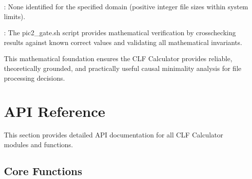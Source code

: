 \documentclass[letterpaper,10pt,english]{sphinxmanual}
\begin{document}
\sphinxAtStartPar
{}: None identified for the specified domain (positive integer file sizes within system limits).

\sphinxAtStartPar
{}: The pic2\_gate.sh script provides mathematical verification by cross\sphinxhyphen{}checking results against known correct values and validating all mathematical invariants.

\sphinxAtStartPar
This mathematical foundation ensures the CLF Calculator provides reliable, theoretically grounded, and practically useful causal minimality analysis for file processing decisions.

\sphinxstepscope


\section{API Reference}
\label{\detokenize{api_reference:api-reference}}\label{\detokenize{api_reference::doc}}
\sphinxAtStartPar
This section provides detailed API documentation for all CLF Calculator modules and functions.


\subsection{Core Functions}
\label{\detokenize{api_reference:core-functions}}
\end{document}
